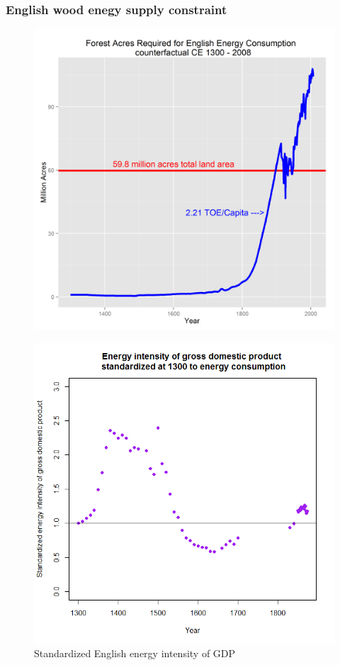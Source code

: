 \documentclass[final]{beamer}
\begin{document}
\begin{frame}
\frametitle{English wood enegy supply constraint}
\begin{figure}[p!]
\center
\label{fig:wood}
\includegraphics[height=0.8\textheight]{wood}
\end{figure}
\end{frame}

\begin{frame}
\begin{figure}[p!]
\center
\caption{Standardized English energy intensity of GDP}
\label{fig:energyIntensity}
\includegraphics[height=0.8\textheight]{energyIntensity}
\end{figure}
\end{frame}
\end{document}
